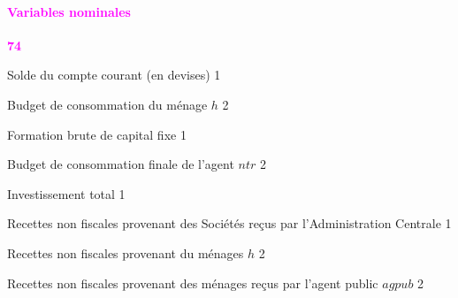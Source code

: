 \documentclass[11pt,a4paper]{article}
\newcommand{\agpub}{\mathit{agpub}}
\newcommand{\CAB}{\mathit{CAB}}
\newcommand{\CG}{\mathit{CG}}
\newcommand{\CTH}{\mathit{CTH}}
\newcommand{\FBCF}{\mathit{FBCF}}
\newcommand{\NTXHH}{\mathit{NTXHH}}
\newcommand{\IT}{\mathit{IT}}
\newcommand{\ntr}{\mathit{ntr}}
\newcommand{\NTXF}{\mathit{NTXF}}
\newcommand{\NTXH}{\mathit{NTXH}}
\newcommand{\redparagraph}[1]{\paragraph*{\large\textcolor{Fuchsia}{#1}}}
\begin{document}
	\redparagraph{Variables nominales}\hfill \textcolor{Fuchsia}{\textbf{74}} 
	\begin{description}[leftmargin=!,labelwidth=\widthof{\bfseries AAAAAAAA},parsep=10pt]
		
		\item[$\CAB$]	Solde du compte courant (en devises)				\hfill 1
		\item[$\CTH_h$]	Budget de consommation du ménage $h$ 	\hfill 2
		\item[$\FBCF$]	Formation brute de capital fixe 		\hfill 1%
		\item[$\CG_{\ntr}$]	Budget de consommation finale de l'agent $\ntr$	\hfill 2
		\item[$\IT$]	Investissement total 								\hfill 1
		\item[$\NTXF$]   Recettes non fiscales provenant des Sociétés reçus par l'Administration Centrale \hfill 1
		\item[$\NTXH_h$]  Recettes non fiscales provenant du ménages $h$ \hfill 2
		\item[$\NTXHH_{\agpub}$] Recettes non fiscales provenant des ménages reçus par l'agent public $\agpub$ \hfill 2
		

\end{description}
\end{document}
